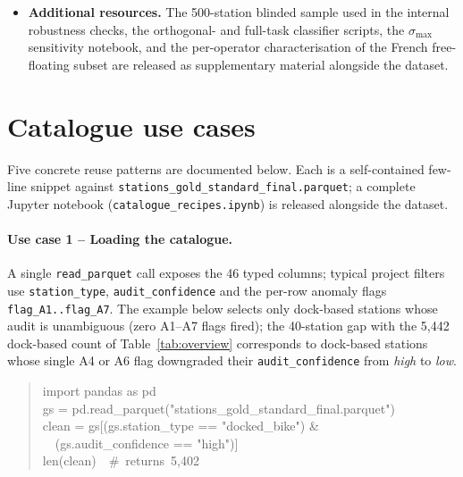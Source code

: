 \documentclass[11pt,a4paper]{article}
\begin{document}
\begin{itemize}[leftmargin=*]
result of the 1{,}509-system MobilityData-catalogue audit is
versioned as code rather than as data, because the upstream
catalogue evolves. A re-run is one command:
\texttt{python -m audit\_pipeline.global\_audit} from the source
repository. The output (\texttt{massive\_audit\_results.csv} and
\texttt{massive\_audit\_summary.json}) is regenerated on every
release and archived as a Zenodo asset attached to the corresponding
tag.
\item \textbf{Additional resources.} The 500-station blinded sample
used in the internal robustness checks, the orthogonal- and full-task
classifier scripts, the $\sigma_{\max}$ sensitivity notebook, and the
per-operator characterisation of the French free-floating subset
are released as supplementary material alongside the dataset.
\end{itemize}

\appendix
\section{Catalogue use cases}

Five concrete reuse patterns are documented below. Each is a
self-contained few-line snippet against
\texttt{stations\_gold\_standard\_final.parquet}; a complete
Jupyter notebook (\texttt{catalogue\_recipes.ipynb}) is released
alongside the dataset.

\paragraph{Use case 1 -- Loading the catalogue.}
A single \texttt{read\_parquet} call exposes the 46 typed columns;
typical project filters use \texttt{station\_type},
\texttt{audit\_confidence} and the per-row anomaly flags
\texttt{flag\_A1..flag\_A7}. The example below selects only
dock-based stations whose audit is unambiguous (zero A1--A7 flags
fired); the 40-station gap with the 5{,}442 dock-based count of
Table~\ref{tab:overview} corresponds to dock-based stations whose
single A4 or A6 flag downgraded their \texttt{audit\_confidence}
from \emph{high} to \emph{low}.
\begin{quote}\small\ttfamily
import pandas as pd\\
gs = pd.read\_parquet("stations\_gold\_standard\_final.parquet")\\
clean = gs[(gs.station\_type == "docked\_bike") \&\\
\ \ (gs.audit\_confidence == "high")]\\
len(clean)\ \ \#\ returns\ 5{,}402
\end{quote}
\end{document}
